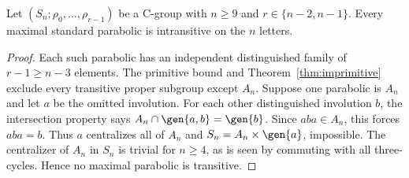 \begin{corollary}\label{cor:intransitive}
Let $(S_n;\rho_0,\ldots,\rho_{r-1})$ be a C-group with
$n\geq9$ and $r\in\{n-2,n-1\}$. Every maximal standard
parabolic is intransitive on the $n$ letters.
\end{corollary}
\begin{proof}
Each such parabolic has an independent distinguished family of
$r-1\geq n-3$ elements. The primitive bound and
Theorem~\ref{thm:imprimitive} exclude every transitive proper
subgroup except $A_n$. Suppose one parabolic is $A_n$ and let
$a$ be the omitted involution. For each other distinguished
involution $b$, the intersection property says
$A_n\cap\gen{a,b}=\gen{b}$. Since $aba\in A_n$, this forces
$aba=b$. Thus $a$ centralizes all of $A_n$ and
$S_n=A_n\times\gen{a}$, impossible. The centralizer of $A_n$
in $S_n$ is trivial for $n\geq4$, as is seen by commuting with
all three-cycles. Hence no maximal parabolic is transitive.
\end{proof}

